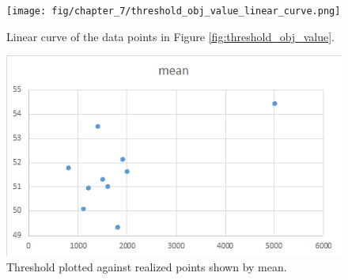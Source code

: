 \begin{figure}[H]
    \centering
    \texttt{[image: fig/chapter\_7/threshold\_obj\_value\_linear\_curve.png]}
    \caption{Linear curve of the data points in Figure \ref{fig:threshold_obj_value}.}
\label{fig:threshold_obj_value_linear_curve}    
\end{figure}


\begin{figure}[H]
    \centering
    \includegraphics[scale=0.75]{fig/chapter_7/threshold_mean.png}
    \caption{Threshold plotted against realized points shown by mean.}
\label{fig:threshold_mean}    
\end{figure}


